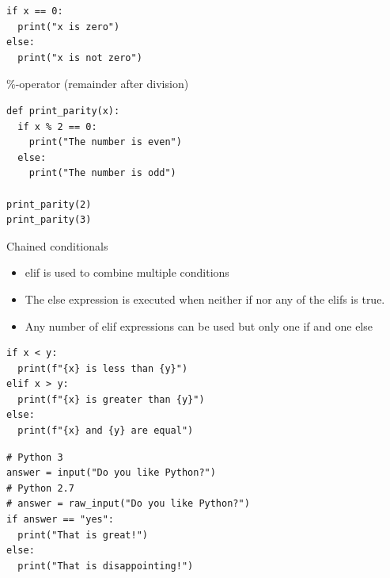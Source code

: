 \documentclass[10pt, a4paper]{beamer} %
\newcommand{\lb}[1]{{\color{mLightBrown}#1}}
\begin{document}
\begin{frame}
  \begin{lstlisting}
if x == 0:
  print("x is zero")
else:
  print("x is not zero")
\end{lstlisting}

  \framebreak

  \begin{examples}
    \begin{block}{\color{mLightBrown}\%-operator (remainder after division)}
      {}
    \end{block}
  \end{examples}
  \begin{lstlisting}
def print_parity(x):
  if x % 2 == 0:
    print("The number is even")
  else:
    print("The number is odd")

print_parity(2)
print_parity(3)
\end{lstlisting}

  \framebreak

  \begin{block}{Chained conditionals}
    \begin{itemize}
      \item \lb{elif} is used to combine multiple conditions
      \item The \lb{else} expression is executed when neither \lb{if} nor any of the \lb{elif}s is true.
      \item Any number of \lb{elif} expressions can be used but only one \lb{if} and one \lb{else}
    \end{itemize}
  \end{block}


  \framebreak

  \begin{examples}
    \begin{lstlisting}
if x < y:
  print(f"{x} is less than {y}")
elif x > y:
  print(f"{x} is greater than {y}")
else:
  print(f"{x} and {y} are equal")
\end{lstlisting}
    \begin{lstlisting}
# Python 3
answer = input("Do you like Python?")
# Python 2.7
# answer = raw_input("Do you like Python?")
if answer == "yes":
  print("That is great!")
else:
  print("That is disappointing!")
\end{lstlisting}
  \end{examples}
\end{frame}
\end{document}
